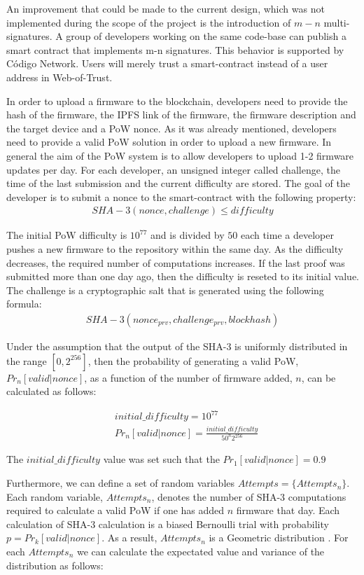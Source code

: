 {{{An improvement that could be made to the current design, which was not implemented during the scope of the project is the introduction of $m-n$ multi-signatures. A group of developers working on the same code-base can publish a smart contract that implements m-n signatures. This behavior is supported by Código Network. Users will merely trust a smart-contract instead of a user address in Web-of-Trust.

In order to upload a firmware to the blockchain, developers need to provide the hash of the firmware, the IPFS link of the firmware, the firmware description and the target device and a PoW nonce. As it was already mentioned, developers need to provide a valid PoW solution in order to upload a new firmware. In general the aim of the PoW system is to allow developers to upload 1-2 firmware updates per day. For each developer, an unsigned integer called challenge, the time of the last submission and the current difficulty are stored. The goal of the developer is to submit a nonce to the smart-contract with the following property:
\begin{align*}
SHA-3(nonce,challenge) \leq difficulty
\end{align*}

The initial PoW difficulty is $10^{77}$ and is divided by $50$ each time a developer pushes a new firmware to the repository within the same day. As the difficulty decreases, the required number of computations increases. If the last proof was submitted more than one day ago, then the difficulty is reseted to its initial value. The challenge is a cryptographic salt that is generated using the following formula:
\begin{align*}
SHA-3(nonce_{prv},challenge_{prv},blockhash)
\end{align*}

Under the assumption that the output of the SHA-3 is uniformly distributed in the range $[0,2^{256}]$, then the probability of generating a valid PoW, $Pr_n[valid|nonce]$, as a function of the number of firmware added, $n$, can be calculated as follows:

\begin{align*}
&initial\_difficulty = 10^{77} \\
&Pr_n[valid|nonce] = \frac{initial\_difficulty}{50^n 2^{256}}
\end{align*}

The $initial\_difficulty$ value was set such that the $Pr_1[valid|nonce] = 0.9$

Furthermore, we can define a set of random variables $Attempts = \{Attempts_n\}$. Each random variable, $Attempts_n$, denotes the number of SHA-3 computations required to calculate a valid PoW if one has added $n$ firmware that day. Each calculation of SHA-3 calculation is a biased Bernoulli trial with probability $p=Pr_k[valid|nonce]$. As a result, $Attempts_n$ is a Geometric distribution \cite{ProbBook}. For each $Attempts_n$ we can calculate the expectated value and variance of the distribution as follows:

}}}
